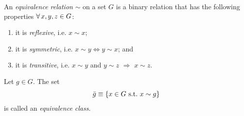 An {\it equivalence relation} $\sim$ on a
set $G$ is a binary relation that has the following properties
$\operatorname{\forall} x,y,z\in G$:
\begin{enumerate}
  \item it is {\it reflexive}, i.e. $x\sim x$;
  \item it is {\it symmetric}, i.e.
        $x\sim y\Leftrightarrow y\sim x$; and
  \item it is {\it transitive}, i.e. $x\sim y$ and
        $y\sim z$ $\Rightarrow$ $x\sim z$.
\end{enumerate}
Let $g\in G$. The set
\begin{equation}
\bar{g}\equiv\left\{x\in G~\text{s.t.}~ x\sim g\right\}
\end{equation}
is called an {\it equivalence class}.


